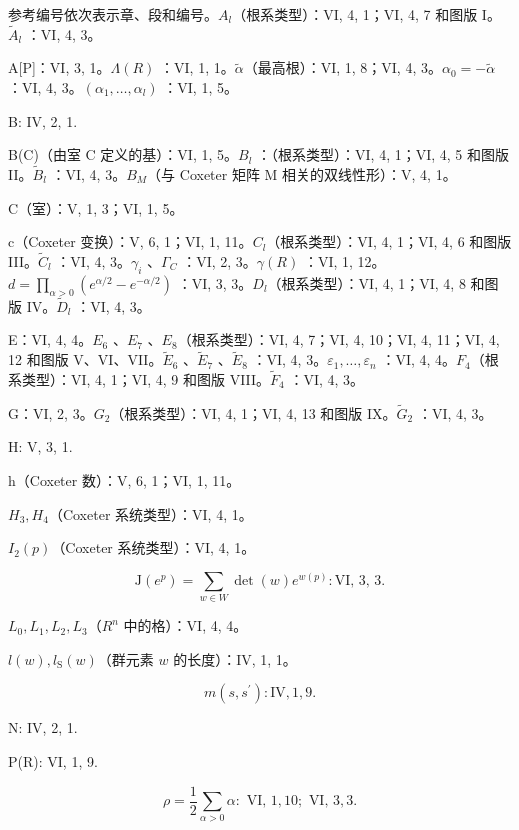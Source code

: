 
参考编号依次表示章、段和编号。\(A_{l}\)（根系类型）：VI, 4, 1；VI, 4, 7 和图版 I。\(\tilde{A}_{l}\) ：VI, 4, 3。

A{[}P{]}：VI, 3, 1。\(\Lambda(R)\) ：VI, 1, 1。\(\tilde{\alpha}\)（最高根）：VI, 1, 8；VI, 4, 3。\(\alpha_{0} = -\tilde{\alpha}\) ：VI, 4, 3。\((\alpha_{1}, \ldots, \alpha_{l})\) ：VI, 1, 5。

B: IV, 2, 1.

B(C)（由室 C 定义的基）：VI, 1, 5。\(B_{l}\) ：（根系类型）：VI, 4, 1；VI, 4, 5 和图版 II。\(\tilde{B}_{l}\) ：VI, 4, 3。\(B_{M}\)（与 Coxeter 矩阵 M 相关的双线性形）：V, 4, 1。

C（室）：V, 1, 3；VI, 1, 5。

c（Coxeter 变换）：V, 6, 1；VI, 1, 11。\(C_{l}\)（根系类型）：VI, 4, 1；VI, 4, 6 和图版 III。\(\tilde{C}_{l}\) ：VI, 4, 3。\(\gamma_{i}\) 、\(\Gamma_{C}\) ：VI, 2, 3。\(\gamma(R)\) ：VI, 1, 12。\(d = \prod_{\alpha > 0} (e^{\alpha/2} - e^{-\alpha/2})\) ：VI, 3, 3。\(D_{l}\)（根系类型）：VI, 4, 1；VI, 4, 8 和图版 IV。\(\tilde{D}_{l}\) ：VI, 4, 3。

E：VI, 4, 4。\(E_{6}\) 、\(E_{7}\) 、\(E_{8}\)（根系类型）：VI, 4, 7；VI, 4, 10；VI, 4, 11；VI, 4, 12 和图版 V、VI、VII。\(\tilde{E}_{6}\) 、\(\tilde{E}_{7}\) 、\(\tilde{E}_{8}\) ：VI, 4, 3。\(\varepsilon_{1}, \ldots, \varepsilon_{n}\) ：VI, 4, 4。\(F_{4}\)（根系类型）：VI, 4, 1；VI, 4, 9 和图版 VIII。\(\tilde{F}_{4}\) ：VI, 4, 3。

G：VI, 2, 3。\(G_{2}\)（根系类型）：VI, 4, 1；VI, 4, 13 和图版 IX。\(\tilde{G}_{2}\) ：VI, 4, 3。

H: V, 3, 1.

h（Coxeter 数）：V, 6, 1；VI, 1, 11。

\(H_{3}, H_{4}\)（Coxeter 系统类型）：VI, 4, 1。

\(I_{2}(p)\)（Coxeter 系统类型）：VI, 4, 1。

\[
\mathrm{J} (e ^ {p}) = \sum_ {w \in W} \det (w) e ^ {w (p)}: \text {VI, 3, 3.}
\]

\(L_{0}, L_{1}, L_{2}, L_{3}\)（\(R^{n}\) 中的格）：VI, 4, 4。

\(l(w), l_{\mathrm{S}}(w)\)（群元素 \(w\) 的长度）：IV, 1, 1。

\[
m (s, s ^ {\prime}): \mathrm{IV}, 1, 9.
\]

N: IV, 2, 1.

P(R): VI, 1, 9.

\[
\rho = \frac {1}{2} \sum_ {\alpha > 0} \alpha : \text { VI, } 1, 10; \text { VI, } 3, 3.
\]

